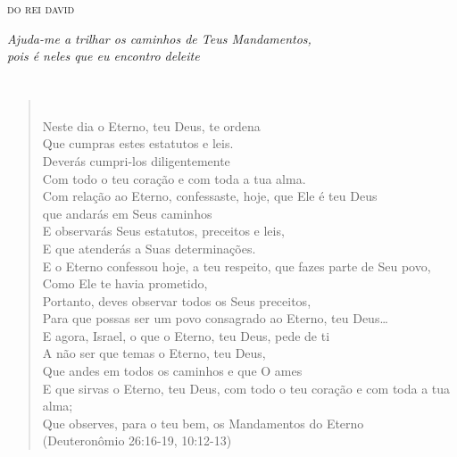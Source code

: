\chapter*{}
\thispagestyle{empty}
\begin{flushright}
\begin{vplace}[30]
\textsc{do rei david}

\emph{Ajuda-me a trilhar os caminhos de Teus Mandamentos,\\ pois é neles
que eu encontro deleite}
\end{vplace}
\end{flushright}

\chapter*{}
\thispagestyle{empty}
\begin{verse}
\\[10pt]

Neste dia o Eterno, teu Deus, te ordena\\
Que cumpras estes estatutos e leis.\\
Deverás cumpri-los diligentemente\\
Com todo o teu coração e com toda a tua alma.\\[10pt]

Com relação ao Eterno, confessaste, hoje, que Ele é teu \qb{}Deus\\
que andarás em Seus caminhos\\
E observarás Seus estatutos, preceitos e leis,\\
E que atenderás a Suas determinações.\\[10pt]
 
E o Eterno confessou hoje, a teu respeito, que fazes parte \qb{}de Seu povo,\\
Como Ele te havia prometido,\\
Portanto, deves observar todos os Seus preceitos,\\
Para que possas ser um povo consagrado ao Eterno, teu \qb{}Deus\ldots{}\\[10pt]

E agora, Israel, o que o Eterno, teu Deus, pede de ti\\
A não ser que temas o Eterno, teu Deus,\\[10pt]

Que andes em todos os caminhos e que O ames\\
E que sirvas o Eterno, teu Deus, com todo o teu coração e \qb{}com toda a tua alma;\\
Que observes, para o teu bem, os Mandamentos do Eterno\\\bigskip
\hfill{}(Deuteronômio 26:16-19, 10:12-13) 
\end{verse}


